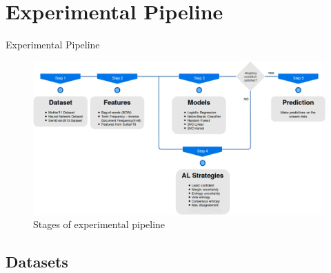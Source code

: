 \documentclass{beamer}
\begin{document}
\section{Experimental Pipeline}
\begin{frame}{Experimental Pipeline}
	
	\textbf{}
	
		\begin{figure}[!htb]
			\centering
			\includegraphics[scale=0.26]{images/experiment_pipeline}
			\caption{Stages of experimental pipeline}
			\label{experiment_pipeline}
		\end{figure}
\end{frame}



\subsection{Datasets}
\end{document}
